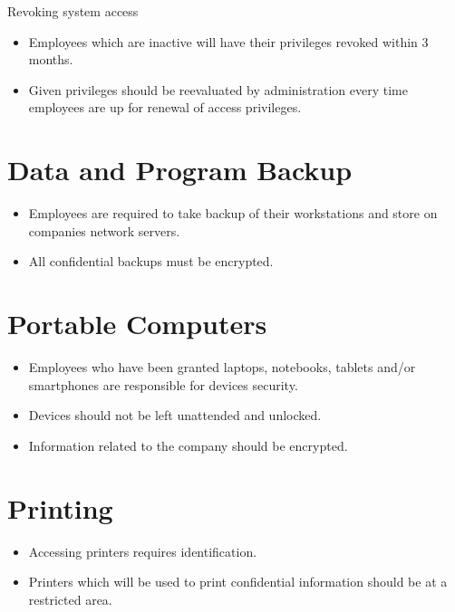 Revoking system access
    \begin{itemize}[noitemsep]
        \item Employees which are inactive will have their privileges revoked within 3 months.
        \item Given privileges should be reevaluated by administration every time employees are up for renewal of access privileges.
    \end{itemize}

\section{Data and Program Backup}

    \begin{itemize}[noitemsep]
        \item Employees are required to take backup of their workstations and store on companies network servers.
        \item All confidential backups must be encrypted.

    \end{itemize}
    

\section{Portable Computers}

    \begin{itemize}[noitemsep]
        \item Employees who have been granted laptops, notebooks, tablets and/or smartphones are responsible for devices security.
        \item Devices should not be left unattended and unlocked.
        \item Information related to the company should be encrypted.

    \end{itemize}{}
    

\section{Printing}

    \begin{itemize}[noitemsep]
        \item Accessing printers requires identification.
        \item Printers which will be used to print confidential information should be at a restricted area.
    \end{itemize}{}
    

